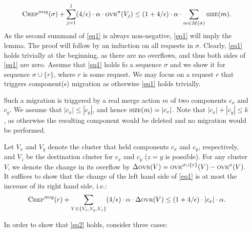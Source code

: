 \documentclass[xcolor=dvipsnames, tikz, 12pt]{article}
\newcommand{\crep}{C{\scriptsize REP}}
\newcommand{\size}{\text{\scriptsize SIZE}}
\newcommand{\ovr}{\text{\scriptsize OVR}}
\theoremstyle{definition}
\begin{document}
\begin{align}
\text{\crep{}}^{mig}(\sigma)+\displaystyle\sum_{j=1}^l(4/\epsilon)\cdot\alpha\cdot\ovr^\sigma(V_j)\leq(1+4/\epsilon)\cdot\alpha\cdot\sum_{m\in M(\sigma)}\size(m).\label{eq1}
\end{align}
As the second summand of \ref{eq1} is always non-negative, \ref{eq1} will imply the lemma.
The proof will follow by an induction on all requests in $\sigma$. Clearly, \ref{eq1} holds trivially at the beginning, as there are no overflows, and thus both sides of \ref{eq1} are zero.
Assume that \ref{eq1} holds fo a sequence $\sigma$ and we show it for sequence $\sigma\cup\{r\}$, where $r$ is some request.
We may focus on a request $r$ that triggers component(s) migration as otherwise \ref{eq1} holds trivially.

Such a migration is triggered by a real merge action $m$ of two components $c_x$ and $c_y$. We assume that $|c_x|\leq|c_y|$, and hence $\size(m)=|c_x|$. Note that $|c_x|+|c_y|\leq k$, as otherwise the resulting component would be deleted and no migration would be performed.

Let $V_x$ and $V_y$ denote the cluster that held components $c_x$ and $c_y$, respectively, and $V_z$ be the destination cluster for $c_x$ and $c_y$ ($z=y$ is possible). For any cluster $V$, we denote the change in its overflow by $\Delta\ovr(V)=\ovr^{\sigma\cup\{r\}}(V)-\ovr{}^{\sigma}(V)$. It suffices to show that the change of the left hand side of \ref{eq1} is at most the increase of its right hand side, i.e.:
\begin{align}
\text{\crep{}}^{mig}(r)+\displaystyle\sum_{V\in\{V_x, V_y, V_z\}}(4/\epsilon)\cdot\alpha\cdot\Delta\ovr{}(V)\leq(1+4/\epsilon)\cdot|c_x|\cdot\alpha.\label{eq2}
\end{align}

In order to show that \ref{eq2} holds, consider three cases:
\end{document}
